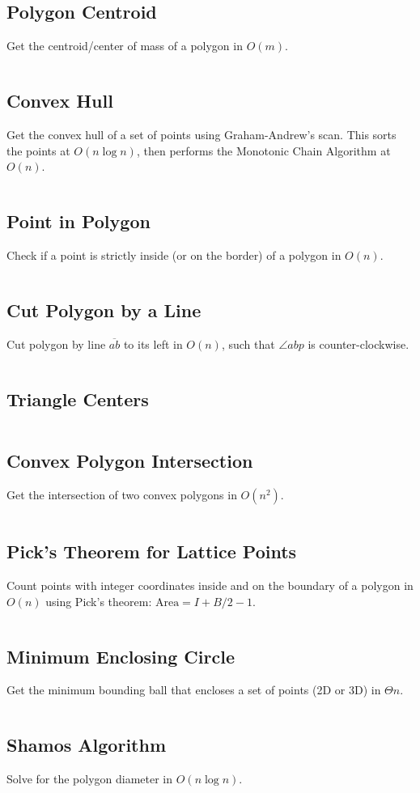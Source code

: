 \documentclass[8pt,a4paper,landscape,oneside]{amsart}
\newcommand{\code}[1]{\inputminted[fontsize=\normalsize,baselinestretch=1]{cpp}{_code/#1}}
\begin{document}
\begin{multicols*}{3}
  \subsection{Polygon Centroid}
    Get the centroid/center of mass of a polygon in $O(m)$.
    \code{geom/poly-centroid.cpp}
  \subsection{Convex Hull}
    Get the convex hull of a set of points using Graham-Andrew's scan. This sorts the
    points at $O(n \log n)$, then performs the Monotonic Chain Algorithm at $O(n)$.
    \code{geom/convex-hull.cpp}
  \subsection{Point in Polygon}
    Check if a point is strictly inside (or on the border) of a polygon in $O(n)$.
    \code{geom/pt-in-poly.cpp}
  \subsection{Cut Polygon by a Line}
    Cut polygon by line $\overline{ab}$ to its left in $O(n)$, such that $\angle abp$ is counter-clockwise.
    \code{geom/cut-poly.cpp}
  \subsection{Triangle Centers}
    \code{geom/tri-centers.cpp}
  \subsection{Convex Polygon Intersection}
    Get the intersection of two convex polygons in $O(n^2)$.
    \code{geom/convex-poly-isect.cpp}
  \subsection{Pick's Theorem for Lattice Points}
    Count points with integer coordinates inside and on the boundary of a polygon in
    $O(n)$ using Pick's theorem: $\text{Area} = I + B/2 - 1$.
    \code{geom/picks.cpp}
  \subsection{Minimum Enclosing Circle}
    Get the minimum bounding ball that encloses a set of points (2D or 3D) in $\Theta{n}$.
    \code{geom/min-enclosing-circ.cpp}
  \subsection{Shamos Algorithm}
    Solve for the polygon diameter in $O(n \log n)$.
    \code{geom/shamos.cpp}

\end{multicols*}
\end{document}
